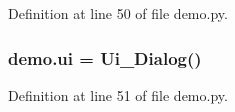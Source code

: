 Definition at line 50 of file demo.\+py.

\subsubsection[{\texorpdfstring{ui}{ui}}]{\setlength{\rightskip}{0pt plus 5cm}demo.\+ui = {\bf Ui\+\_\+\+Dialog}()}\hypertarget{namespacedemo_a7c0d109adac145246119b1470b825e05}{}\label{namespacedemo_a7c0d109adac145246119b1470b825e05}


Definition at line 51 of file demo.\+py.

